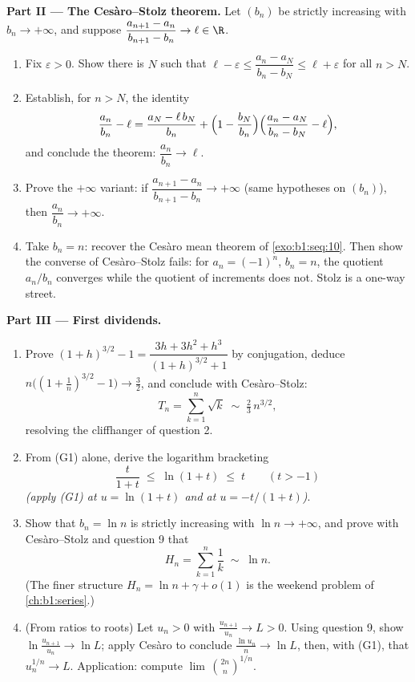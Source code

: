 \begin{problem}[{Weekend problem --- the Ces\`aro--Stolz theorem
and the asymptotics $u_n \sim \sqrt{3/n}$ for $u_{n+1} = \sin
u_n$}]
\medskip
\noindent\textbf{Part II --- The Ces\`aro--Stolz theorem.} Let
$(b_n)$ be strictly increasing with $b_n \to +\infty$, and
suppose $\dfrac{a_{n+1} - a_n}{b_{n+1} - b_n} \to \ell \in \R$.
\begin{enumerate}[resume]
  \item Fix $\varepsilon > 0$. Show there is $N$ such that
        $\ell - \varepsilon \leq \dfrac{a_n - a_N}{b_n - b_N}
        \leq \ell + \varepsilon$ for all $n > N$.
  \item Establish, for $n > N$, the identity
        \[
        \frac{a_n}{b_n} - \ell
        = \frac{a_N - \ell\,b_N}{b_n}
        + \Bigl(1 - \frac{b_N}{b_n}\Bigr)
        \Bigl(\frac{a_n - a_N}{b_n - b_N} - \ell\Bigr),
        \]
        and conclude the theorem: $\dfrac{a_n}{b_n} \to \ell$.
  \item Prove the $+\infty$ variant: if $\dfrac{a_{n+1} -
        a_n}{b_{n+1} - b_n} \to +\infty$ (same hypotheses on
        $(b_n)$), then $\dfrac{a_n}{b_n} \to +\infty$.
  \item Take $b_n = n$: recover the Ces\`aro mean theorem of
        \cref{exo:b1:seq:10}. Then show the converse of
        Ces\`aro--Stolz fails: for $a_n = (-1)^n$, $b_n = n$, the
        quotient $a_n/b_n$ converges while the quotient of
        increments does not. Stolz is a one-way street.
\end{enumerate}

\medskip
\noindent\textbf{Part III --- First dividends.}
\begin{enumerate}[resume]
  \item Prove $(1+h)^{3/2} - 1 = \dfrac{3h + 3h^2 +
        h^3}{(1+h)^{3/2} + 1}$ by conjugation, deduce
        $n\bigl((1 + \tfrac1n)^{3/2} - 1\bigr) \to \tfrac32$,
        and conclude with Ces\`aro--Stolz:
        \[
        T_n = \sum_{k=1}^{n} \sqrt k \;\sim\; \tfrac23\,
        n^{3/2} ,
        \]
        resolving the cliffhanger of question 2.
  \item From (G1) alone, derive the logarithm bracketing
        \[
        \frac{t}{1 + t} \;\leq\; \ln(1 + t) \;\leq\; t
        \qquad (t > -1)
        \]
        \emph{(apply (G1) at $u = \ln(1+t)$ and at $u =
        -t/(1+t)$)}.
  \item Show that $b_n = \ln n$ is strictly increasing with
        $\ln n \to +\infty$, and prove with Ces\`aro--Stolz and
        question 9 that
        \[
        H_n = \sum_{k=1}^{n} \frac 1k \;\sim\; \ln n .
        \]
        (The finer structure $H_n = \ln n + \gamma + o(1)$ is the
        weekend problem of \cref{ch:b1:series}.)
  \item (From ratios to roots) Let $u_n > 0 $ with
        $\frac{u_{n+1}}{u_n} \to L > 0$. Using question 9, show
        $\ln\frac{u_{n+1}}{u_n} \to \ln L$; apply Ces\`aro to
        conclude $\frac{\ln u_n}{n} \to \ln L$, then, with (G1),
        that $u_n^{1/n} \to L$. Application: compute
        $\lim\,\binom{2n}{n}^{1/n}$.
\end{enumerate}


\end{problem}
